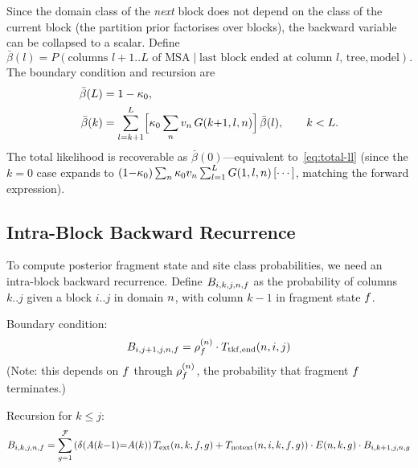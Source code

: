 Since the domain class of the \emph{next} block does not depend on the
class of the current block (the partition prior factorises over blocks),
the backward variable can be collapsed to a scalar.
Define
\begin{equation}
  \bar\beta(l) = P(\text{columns } l{+}1..L \text{ of MSA}
  \mid \text{last block ended at column } l,\, \text{tree}, \text{model}).
\end{equation}
The boundary condition and recursion are
\begin{align}
  \bar\beta(L) &= 1-\kappa_0, \label{eq:backward-base}\\
  \bar\beta(k) &= \sum_{l=k+1}^{L}
    \Bigl[\kappa_0 \sum_{n} v_n\, G(k{+}1, l, n)\Bigr]\,
    \bar\beta(l),
    \qquad k < L.
  \label{eq:backward}
\end{align}
The total likelihood is recoverable as
$\bar\beta(0)$---equivalent to~\eqref{eq:total-ll}
(since the $k{=}0$ case expands to
$(1{-}\kappa_0)\sum_n \kappa_0 v_n
\sum_{l=1}^{L} G(1,l,n)\,[\cdots]$,
matching the forward expression).

\subsection{Intra-Block Backward Recurrence}
\label{sec:intra-block-backward}

To compute posterior fragment state and site class probabilities, we
need an intra-block backward recurrence. Define
$B_{i,k,j,n,f}$ as the probability of columns $k..j$ given
a block $i..j$ in domain $n$, with column $k{-}1$ in fragment state
$f$.

Boundary condition:
\begin{equation}
B_{i,j{+}1,j,n,f} = \rho^{(n)}_f \cdot T_{\mathrm{tkf,end}}(n, i, j)
\label{eq:intra-backward-boundary}
\end{equation}
(Note: this depends on $f$ through $\rho^{(n)}_f$,
the probability that fragment $f$ terminates.)

Recursion for $k \leq j$:
\begin{equation}
B_{i,k,j,n,f} = \sum_{g=1}^{\mathcal{F}}
\left(
  \delta(A(k{-}1){=}A(k))\, T_{\mathrm{ext}}(n, k, f, g)
  + T_{\mathrm{notext}}(n, i, k, f, g)
\right) \cdot E(n, k, g) \cdot B_{i,k{+}1,j,n,g}
\label{eq:intra-backward-recurse}
\end{equation}


